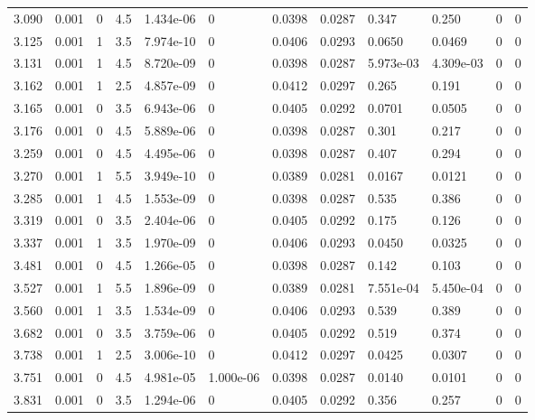 \documentclass[preview]{standalone}
\begin{document}
{{{\begin{tabular}{L{1.2cm}C{1.2cm} C{0.3cm}C{0.5cm} C{1.4cm}C{1.4cm} C{1.4cm}C{1.4cm} C{1.6cm}C{1.6cm} C{1.6cm}C{1.6cm}}
  3.090  &  0.001  & 0     & 4.5 &  1.434e-06  & 0  &  0.0398&   0.0287& 0.347 & 0.250   &  0 & 0  \\ 
  3.125  &  0.001  & 1     & 3.5 &  7.974e-10  & 0  &  0.0406&   0.0293& 0.0650 & 0.0469   &  0 & 0  \\ 
  3.131  &  0.001  & 1     & 4.5 &  8.720e-09  & 0  &  0.0398&   0.0287& 5.973e-03 & 4.309e-03   &  0 & 0  \\ 
  3.162  &  0.001  & 1     & 2.5 &  4.857e-09  & 0  &  0.0412&   0.0297& 0.265 & 0.191   &  0 & 0  \\ 
  3.165  &  0.001  & 0     & 3.5 &  6.943e-06  & 0  &  0.0405&   0.0292& 0.0701 & 0.0505   &  0 & 0  \\ 
  3.176  &  0.001  & 0     & 4.5 &  5.889e-06  & 0  &  0.0398&   0.0287& 0.301 & 0.217   &  0 & 0  \\ 
  3.259  &  0.001  & 0     & 4.5 &  4.495e-06  & 0  &  0.0398&   0.0287& 0.407 & 0.294   &  0 & 0  \\ 
  3.270  &  0.001  & 1     & 5.5 &  3.949e-10  & 0  &  0.0389&   0.0281& 0.0167 & 0.0121   &  0 & 0  \\ 
  3.285  &  0.001  & 1     & 4.5 &  1.553e-09  & 0  &  0.0398&   0.0287& 0.535 & 0.386   &  0 & 0  \\ 
  3.319  &  0.001  & 0     & 3.5 &  2.404e-06  & 0  &  0.0405&   0.0292& 0.175 & 0.126   &  0 & 0  \\ 
  3.337  &  0.001  & 1     & 3.5 &  1.970e-09  & 0  &  0.0406&   0.0293& 0.0450 & 0.0325   &  0 & 0  \\ 
  3.481  &  0.001  & 0     & 4.5 &  1.266e-05  & 0  &  0.0398&   0.0287& 0.142 & 0.103   &  0 & 0  \\ 
  3.527  &  0.001  & 1     & 5.5 &  1.896e-09  & 0  &  0.0389&   0.0281& 7.551e-04 & 5.450e-04   &  0 & 0  \\ 
  3.560  &  0.001  & 1     & 3.5 &  1.534e-09  & 0  &  0.0406&   0.0293& 0.539 & 0.389   &  0 & 0  \\ 
  3.682  &  0.001  & 0     & 3.5 &  3.759e-06  & 0  &  0.0405&   0.0292& 0.519 & 0.374   &  0 & 0  \\ 
  3.738  &  0.001  & 1     & 2.5 &  3.006e-10  & 0  &  0.0412&   0.0297& 0.0425 & 0.0307   &  0 & 0  \\ 
  3.751  &  0.001  & 0     & 4.5 &  4.981e-05  & 1.000e-06  &  0.0398&   0.0287& 0.0140 & 0.0101   &  0 & 0  \\ 
  3.831  &  0.001  & 0     & 3.5 &  1.294e-06  & 0  &  0.0405&   0.0292& 0.356 & 0.257   &  0 & 0  \\ 

\end{tabular}}}}
\end{document}
